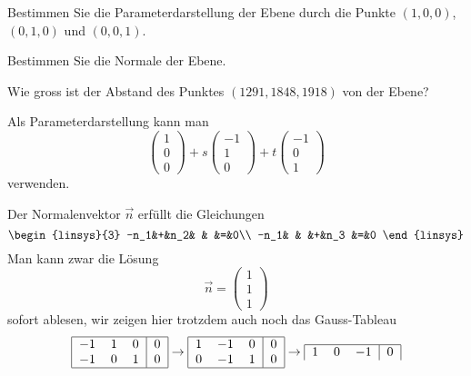 \begin{teilaufgaben}
\item Bestimmen Sie die Parameterdarstellung der Ebene durch die
Punkte $(1,0,0)$, $(0,1,0)$ und $(0,0,1)$.
\item Bestimmen Sie die Normale der Ebene.
\item Wie gross ist der Abstand des Punktes $(1291, 1848, 1918)$ von
der Ebene?
\end{teilaufgaben}


\begin{loesung}
\begin{teilaufgaben}
\item Als Parameterdarstellung kann man
\[
\begin{pmatrix}1\\0\\0\end{pmatrix}
+s\begin{pmatrix}-1\\1\\0\end{pmatrix}
+t\begin{pmatrix}-1\\0\\1\end{pmatrix}
\]
verwenden.
\item  Der Normalenvektor $\vec n$ erfüllt die Gleichungen
\[
\begin{linsys}{3}
-n_1&+&n_2& &    &=&0\\
-n_1& &   &+&n_3 &=&0
\end{linsys}
\]
Man kann zwar die Lösung
\[
\vec n=
\begin{pmatrix}1\\1\\1\end{pmatrix}
\]
sofort ablesen, wir zeigen hier trotzdem auch noch das Gauss-Tableau
\[
\begin{tabular}{|ccc|c|}
\hline
$-1$&1&0&0\\
$-1$&0&1&0\\
\hline
\end{tabular}
\rightarrow
\begin{tabular}{|ccc|c|}
\hline
1&$-1$&0&0\\
0&$-1$&1&0\\
\hline
\end{tabular}
\rightarrow
\begin{tabular}{|ccc|c|}
\hline
1& 0&$-1$&0\\

\end{tabular}\]
\end{teilaufgaben}
\end{loesung}
